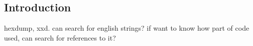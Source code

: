 
\subsection{Introduction}
 
hexdump, xxd. can search for english strings? if want to know how part of code used, can search for references to it?